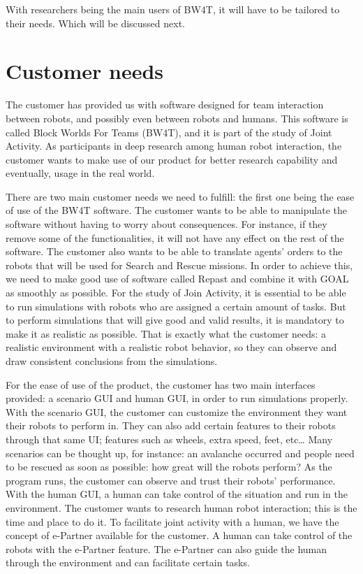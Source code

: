 \documentclass[a4paper]{article}
\begin{document}
With researchers being the main users of BW4T, it will have to be tailored to their needs. Which will be discussed next.

\section{Customer needs}
The customer has provided us with software designed for team interaction between robots, and possibly even between robots and humans. This software is called Block Worlds For Teams (BW4T), and it is part of the study of Joint Activity. As participants in deep research among human robot interaction, the customer wants to make use of our product for better research capability and eventually, usage in the real world.

There are two main customer needs we need to fulfill: the first one being the ease of use of the BW4T software. The customer wants to be able to manipulate the software without having to worry about consequences. For instance, if they remove some of the functionalities, it will not have any effect on the rest of the software. The customer also wants to be able to translate agents’ orders to the robots that will be used for Search and Rescue missions. In order to achieve this, we need to make good use of software called Repast and combine it with GOAL as smoothly as possible. For the study of Join Activity, it is essential to be able to run simulations with robots who are assigned a certain amount of tasks. But to perform simulations that will give good and valid results, it is mandatory to make it as realistic as possible. That is exactly what the customer needs: a realistic environment with a realistic robot behavior, so they can observe and draw consistent conclusions from the simulations.

For the ease of use of the product, the customer has two main interfaces provided: a scenario GUI and human GUI, in order to run simulations properly. With the scenario GUI, the customer can customize the environment they want their robots to perform in. They can also add certain features to their robots through that same UI; features such as wheels, extra speed, feet, etc… Many scenarios can be thought up, for instance: an avalanche occurred and people need to be rescued as soon as possible: how great will the robots perform? As the program runs, the customer can observe and trust their robots’ performance. With the human GUI, a human can take control of the situation and run in the environment. The customer wants to research human robot interaction; this is the time and place to do it. To facilitate joint activity with a human, we have the concept of e-Partner available for the customer. A human can take control of the robots with the e-Partner feature. The e-Partner can also guide the human through the environment and can facilitate certain tasks.
\end{document}
